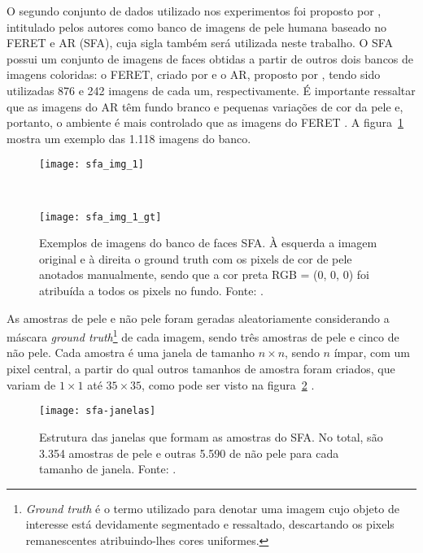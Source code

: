 O segundo conjunto de dados utilizado nos experimentos foi proposto por \citet{sfa-skin-dataset:13}, intitulado pelos autores como banco de imagens de pele humana baseado no FERET e AR (SFA), cuja sigla também será utilizada neste trabalho. O SFA possui um conjunto de imagens de faces obtidas a partir de outros dois bancos de imagens coloridas: o FERET, criado por \citet{feret:96} e o AR, proposto por \citet{ar-face-database:98}, tendo sido utilizadas 876 e 242 imagens de cada um, respectivamente. É importante ressaltar que as imagens do AR têm fundo branco e pequenas variações de cor da pele e, portanto, o ambiente é mais controlado que as imagens do FERET \citep{sfa-skin-dataset:13}. A figura~\ref{fig:sfa_dataset_exemplo} mostra um exemplo das 1.118 imagens do banco.

\begin{figure}[h]
    \centering
    \begin{minipage}{0.3\textwidth}
        \texttt{[image: sfa\_img\_1]}
    \end{minipage}
    ~ %
    \begin{minipage}{0.3\textwidth}
        \texttt{[image: sfa\_img\_1\_gt]}
    \end{minipage}
    \caption[Exemplos de imagens do banco de faces SFA]{Exemplos de imagens do banco de faces SFA. À esquerda a imagem original e à direita o ground truth com os pixels de cor de pele anotados manualmente, sendo que a cor preta RGB = (0, 0, 0) foi atribuída a todos os pixels no fundo. Fonte: \citet{sfa-skin-dataset:13}.}
    \label{fig:sfa_dataset_exemplo}
\end{figure}

As amostras de pele e não pele foram geradas aleatoriamente considerando a máscara \emph{ground truth}\footnote{\emph{Ground truth} é o termo utilizado para denotar uma imagem cujo objeto de interesse está devidamente segmentado e ressaltado, descartando os pixels remanescentes atribuindo-lhes cores uniformes.} de cada imagem, sendo três amostras de pele e cinco de não pele. Cada amostra é uma janela de tamanho $n\times n$, sendo $n$ ímpar, com um pixel central, a partir do qual outros tamanhos de amostra foram criados, que variam de $1 \times 1$ até $35 \times 35$, como pode ser visto na figura~\ref{fig:sfa_dataset_janelas} \citep{sfa-skin-dataset:13}.

\begin{figure}[h]
  \centering
  \texttt{[image: sfa-janelas]}
  \caption[Estrutura das janelas que formam as amostras do SFA]{Estrutura das janelas que formam as amostras do SFA. No total, são 3.354 amostras de pele e outras 5.590 de não pele para cada tamanho de janela. Fonte: \citet{sfa-skin-dataset:13}.}
  \label{fig:sfa_dataset_janelas}
\end{figure}

